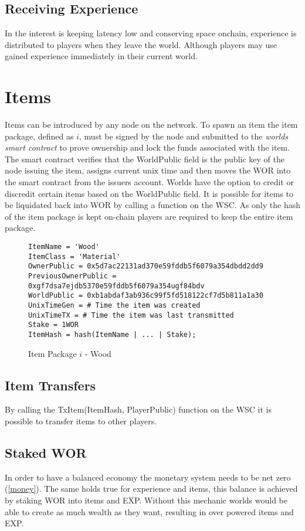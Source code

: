 \documentclass[runningheads,a4paper]{llncs}
\begin{document}
\subsection{Receiving Experience} 
In the interest is keeping latency low and conserving space onchain, experience is distributed to players when they leave the world. Although players may use gained experience immediately in their current world.

\section{Items} 
\label{items}
Items can be introduced by any node on the network. To spawn an item the item package, defined as $i$, must be signed by the node and submitted to the \textit{worlds smart contract} to prove ownership and lock the funds associated with the item. The smart contract verifies that the WorldPublic field is the public key of the node issuing the item, assigns current unix time and then moves the WOR into the smart contract from the issuers account. Worlds have the option to credit or discredit certain items based on the WorldPublic field.  It is possible for items to be liquidated back into WOR by calling a function on the WSC. As only the hash of the item package is kept on-chain players are required to keep the entire item package.

\begin{figure}[H]
\centering
\label{itempkg}
\caption{Item Package $i$ - Wood}
\begin{lstlisting}
ItemName = 'Wood'
ItemClass = 'Material'
OwnerPublic = 0x5d7ac22131ad370e59fddb5f6079a354dbdd2dd9
PreviousOwnerPublic = 0xgf7dsa7ejdb5370e59fddb5f6079a354ugf84bdv
WorldPublic = 0xb1abdaf3ab936c99f5fd518122cf7d5b811a1a30
UnixTimeGen = # Time the item was created
UnixTimeTX = # Time the item was last transmitted
Stake = 1WOR
ItemHash = hash(ItemName | ... | Stake);
\end{lstlisting}
\end{figure}

\subsection{Item Transfers}
By calling the TxItem(ItemHash, PlayerPublic) function on the WSC it is possible to transfer items to other players.

\subsection{Staked WOR}
In order to have a balanced economy the monetary system needs to be net zero (\ref{money}). The same holds true for experience and items, this balance is achieved by staking WOR into items and EXP. Without this mechanic worlds would be able to create as much wealth as they want, resulting in over powered items and EXP. 
\end{document}
